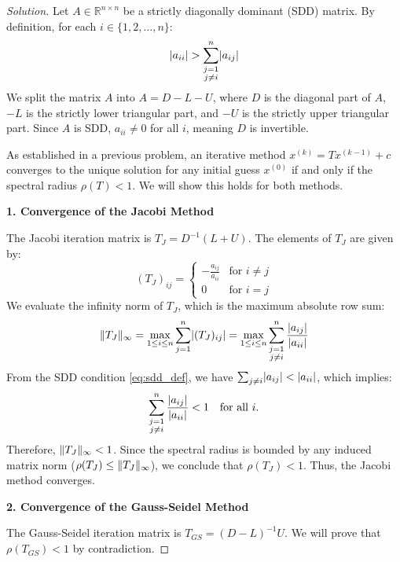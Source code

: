 \documentclass[11pt, a4paper]{article}
\newcommand{\R}{\mathbb{R}}
\DeclarePairedDelimiter\abs{\lvert}{\rvert}
\DeclarePairedDelimiter\norm{\lVert}{\rVert}
\newif\ifsolutionnewpage
\newenvironment{solution}
  {\begin{proof}[Solution]}
  {\end{proof}\ifsolutionnewpage\newpage\fi}
\begin{document}
\solutionnewpagefalse %
\begin{solution}
    Let $A \in \R^{n \times n}$ be a strictly diagonally dominant (SDD) matrix. By definition, for each $i \in \{1, 2, \dots, n\}$:
    \begin{equation}
        \abs{a_{ii}} > \sum_{\substack{j=1 \\ j \neq i}}^n \abs{a_{ij}} \label{eq:sdd_def}
    \end{equation}
    We split the matrix $A$ into $A = D - L - U$, where $D$ is the diagonal part of $A$, $-L$ is the strictly lower triangular part, and $-U$ is the strictly upper triangular part. Since $A$ is SDD, $a_{ii} \neq 0$ for all $i$, meaning $D$ is invertible.

    As established in a previous problem, an iterative method $x^{(k)} = Tx^{(k-1)} + c$ converges to the unique solution for any initial guess $x^{(0)}$ if and only if the spectral radius $\rho(T) < 1$. We will show this holds for both methods.

    \vspace{1em}
    \textbf{1. Convergence of the Jacobi Method}
    
    The Jacobi iteration matrix is $T_J = D^{-1}(L+U)$. The elements of $T_J$ are given by:
    \[
    (T_J)_{ij} = 
    \begin{cases} 
        -\frac{a_{ij}}{a_{ii}} & \text{for } i \neq j \\
        0 & \text{for } i = j 
    \end{cases}
    \]
    We evaluate the infinity norm of $T_J$, which is the maximum absolute row sum:
    \[
    \norm{T_J}_\infty = \max_{1 \le i \le n} \sum_{j=1}^n \abs{(T_J)_{ij}} = \max_{1 \le i \le n} \sum_{\substack{j=1 \\ j \neq i}}^n \frac{\abs{a_{ij}}}{\abs{a_{ii}}}
    \]
    From the SDD condition \eqref{eq:sdd_def}, we have $\sum_{j \neq i} \abs{a_{ij}} < \abs{a_{ii}}$, which implies:
    \[
    \sum_{\substack{j=1 \\ j \neq i}}^n \frac{\abs{a_{ij}}}{\abs{a_{ii}}} < 1 \quad \text{for all } i.
    \]
    Therefore, $\norm{T_J}_\infty < 1$. Since the spectral radius is bounded by any induced matrix norm ($\rho(T_J) \le \norm{T_J}_\infty$), we conclude that $\rho(T_J) < 1$. Thus, the Jacobi method converges.

    \vspace{1em}
    \textbf{2. Convergence of the Gauss-Seidel Method}
    
    The Gauss-Seidel iteration matrix is $T_{GS} = (D-L)^{-1}U$. We will prove that $\rho(T_{GS}) < 1$ by contradiction.
    

\end{solution}
\end{document}
